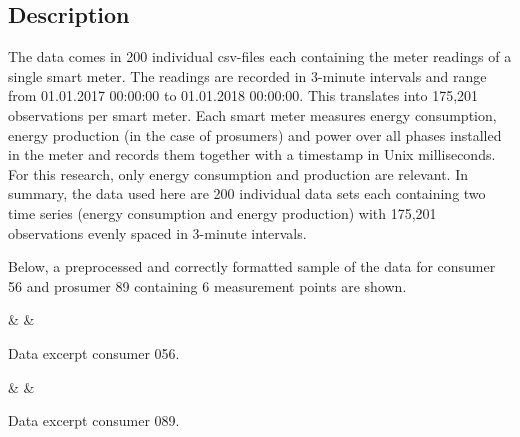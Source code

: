 
\subsection{Description}\label{Sec:Data;Subsec:Description}

The data comes in 200 individual csv-files each containing the meter readings of a single smart meter. The readings are recorded in 3-minute intervals and range from 01.01.2017 00:00:00 to 01.01.2018 00:00:00. This translates into 175,201 observations per smart meter. Each smart meter measures energy consumption,  energy production (in the case of prosumers) and power over all phases installed in the meter and records them together with a timestamp in Unix milliseconds. For this research, only energy consumption and production are relevant. In summary, the data used here are 200 individual data sets each containing two time series (energy consumption and energy production) with 175,201 observations evenly spaced in 3-minute intervals.

Below, a preprocessed and correctly formatted sample of the data for consumer 56 and prosumer 89 containing 6 measurement points are shown.

\begin{table}[h]
    {\csvcolii & \csvcoliii & \csvcoliv}%
    \caption[Data excerpt consumer 056]{Data excerpt consumer 056. \quantnet}
\end{table}

\begin{table}[h]
    {\csvcolii & \csvcoliii & \csvcoliv}%
    \caption[Data excerpt consumer 089]{Data excerpt consumer 089. \quantnet}
\end{table}


